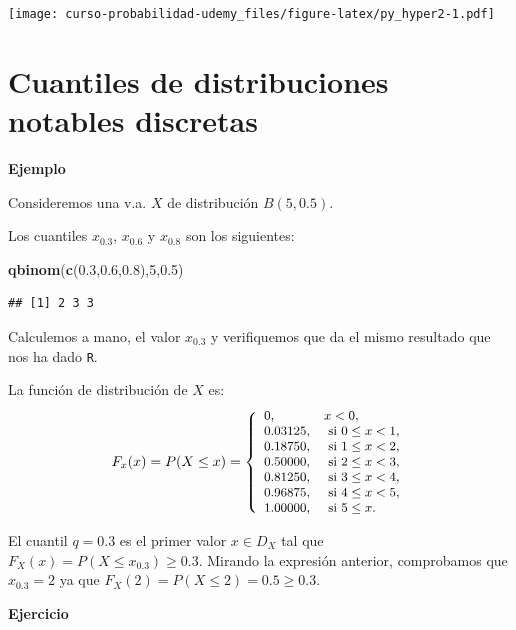 \documentclass[]{book}
\newenvironment{Shaded}{\begin{snugshade}}{\end{snugshade}}
\newcommand{\DecValTok}[1]{\textcolor[rgb]{0.00,0.00,0.81}{#1}}
\newcommand{\FloatTok}[1]{\textcolor[rgb]{0.00,0.00,0.81}{#1}}
\newcommand{\KeywordTok}[1]{\textcolor[rgb]{0.13,0.29,0.53}{\textbf{#1}}}
\newcommand{\NormalTok}[1]{#1}
\begin{document}
\texttt{[image: curso-probabilidad-udemy\_files/figure-latex/py\_hyper2-1.pdf]}

\hypertarget{cuantiles-de-distribuciones-notables-discretas}{%
\section{Cuantiles de distribuciones notables discretas}\label{cuantiles-de-distribuciones-notables-discretas}}

\textbf{Ejemplo}

Consideremos una v.a. \(X\) de distribución \(B(5,0.5)\).

Los cuantiles \(x_{0.3}\), \(x_{0.6}\) y \(x_{0.8}\) son los siguientes:

\begin{Shaded}
\begin{Highlighting}[]
\KeywordTok{qbinom}\NormalTok{(}\KeywordTok{c}\NormalTok{(}\FloatTok{0.3}\NormalTok{,}\FloatTok{0.6}\NormalTok{,}\FloatTok{0.8}\NormalTok{),}\DecValTok{5}\NormalTok{,}\FloatTok{0.5}\NormalTok{)}
\end{Highlighting}
\end{Shaded}

\begin{verbatim}
## [1] 2 3 3
\end{verbatim}

Calculemos a mano, el valor \(x_{0.3}\) y verifiquemos que da el mismo resultado que nos ha dado \texttt{R}.

La función de distribución de \(X\) es:
\[
\small{
F_x(x)=P(X\leq x)=
\left\{
\begin{array}{ll}
0, & x< 0, \\
0.03125, & \mbox{ si } 0 \leq x< 1, \\
0.18750, & \mbox{ si } 1 \leq x< 2, \\
0.50000, & \mbox{ si } 2 \leq x< 3, \\
0.81250, & \mbox{ si } 3 \leq x< 4, \\
0.96875, & \mbox{ si } 4 \leq x< 5, \\
1.00000, & \mbox{ si }  5\leq x. \\
\end{array}
\right.}
\]

El cuantil \(q=0.3\) es el primer valor \(x\in D_X\) tal que \(F_X(x)=P(X\leq x_{0.3})\geq 0.3\). Mirando la expresión anterior, comprobamos que \(x_{0.3}=2\) ya que \(F_X(2)=P(X\leq 2)=0.5 \geq 0.3\).

\textbf{Ejercicio}
\end{document}
